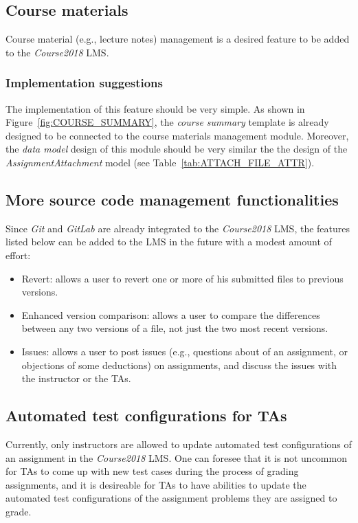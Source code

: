 \subsection{Course materials}
Course material (e.g., lecture notes) management is a desired feature to be
added to the \emph{Course2018} LMS.

\subsubsection{Implementation suggestions}
The implementation of this feature should be very simple.
As shown in
Figure~\ref{fig:COURSE_SUMMARY}, the \emph{course summary} template is already
designed to be connected to the course materials management module.
Moreover, the \emph{data model} design of this module should
be very similar the the design of the \emph{AssignmentAttachment} model 
(see Table~\ref{tab:ATTACH_FILE_ATTR}).

\subsection{More source code management functionalities}
Since \emph{Git} and \emph{GitLab} are already integrated to the
\emph{Course2018} LMS, the features listed below can be added to the LMS in the
future with a modest amount of effort:
\begin{itemize}
    \item Revert: allows a user to revert one or more of his submitted files to
        previous versions.
    \item Enhanced version comparison: allows a user to compare the differences
        between any two versions of a file, not just the two most recent
        versions.
    \item Issues: allows a user to post issues (e.g., questions about of an
        assignment, or objections of some deductions) on assignments, and
        discuss the issues with the instructor or the TAs.
\end{itemize}

\subsection{Automated test configurations for TAs}
Currently, only instructors are allowed to update automated test
configurations of an assignment in the \emph{Course2018} LMS.
One can foresee that it is not uncommon for TAs to come up with new test
cases during the process of grading assignments, and it is desireable for TAs
to have abilities to update the automated test configurations of the assignment
problems they are assigned to grade.

